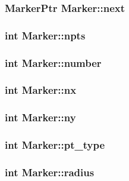 \subsubsection{\setlength{\rightskip}{0pt plus 5cm}\bf{Marker\-Ptr} \bf{Marker::next}}\label{structMarker_002ab91fdeb30ac3c598512508f8d3e0}


\subsubsection{\setlength{\rightskip}{0pt plus 5cm}int \bf{Marker::npts}}\label{structMarker_71221c60ba8df736ea47a5b23baf91eb}


\subsubsection{\setlength{\rightskip}{0pt plus 5cm}int \bf{Marker::number}}\label{structMarker_90e2cf96e8ae40c804bde2ed65d9d74d}


\subsubsection{\setlength{\rightskip}{0pt plus 5cm}int \bf{Marker::nx}}\label{structMarker_7d3eb5e39629553a078555331b98a960}


\subsubsection{\setlength{\rightskip}{0pt plus 5cm}int \bf{Marker::ny}}\label{structMarker_529ed741bff8500425941a317c5fe535}


\subsubsection{\setlength{\rightskip}{0pt plus 5cm}int \bf{Marker::pt\_\-type}}\label{structMarker_f3a9e0d54bdcac2dab9ab0a6799c68a6}


\subsubsection{\setlength{\rightskip}{0pt plus 5cm}int \bf{Marker::radius}}\label{structMarker_5104db2d68ebff3931e5ce3b5ae01d91}


